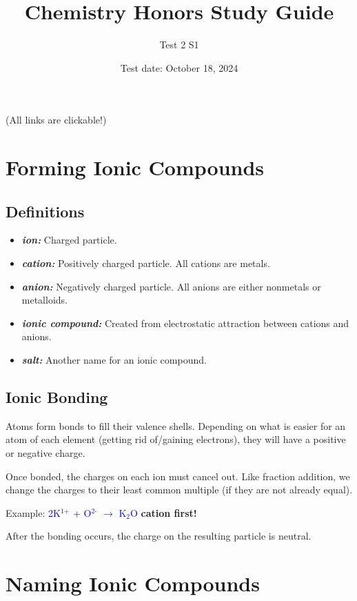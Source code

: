 \documentclass[a4paper, 12pt]{article}
\title{Chemistry Honors Study Guide}
\author{Test 2 S1}
\date{Test date: October 18, 2024}
\begin{document}
\maketitle

\begin{center}
    (All links are clickable!)
\end{center}

\section{Forming Ionic Compounds}

\subsection*{Definitions}
\begin{itemize}[leftmargin=*,nosep]
\item \textbf{\emph{ion:}} Charged particle.
\item \textbf{\emph{cation:}} Positively charged particle. All cations are metals.
\item \textbf{\emph{anion:}} Negatively charged particle. All anions are either nonmetals or metalloids.
\item \textbf{\emph{ionic compound:}} Created from electrostatic attraction between cations and anions.
\item \textbf{\emph{salt:}} Another name for an ionic compound.
\end{itemize}

\subsection*{Ionic Bonding}
Atoms form bonds to fill their valence shells. Depending on what is easier for an atom of each element (getting rid of/gaining electrons), they will have a positive or negative charge.
 
Once bonded, the charges on each ion must cancel out. Like fraction addition, we change the charges to their least common multiple (if they are not already equal).
 
Example: \textcolor{blue}{2K$^{\text{1+}}$ + O$^{\text{2-}}$ $\xrightarrow{}$ K$_2$O} \textbf{cation first!}
 
After the bonding occurs, the charge on the resulting particle is neutral.

\section{Naming Ionic Compounds}
\end{document}
